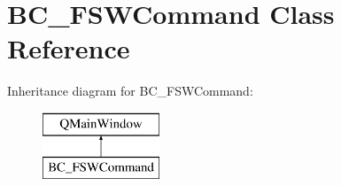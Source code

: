 \hypertarget{class_b_c___f_s_w_command}{}\section{B\+C\+\_\+\+F\+S\+W\+Command Class Reference}
\label{class_b_c___f_s_w_command}
Inheritance diagram for B\+C\+\_\+\+F\+S\+W\+Command\+:\begin{figure}[H]
\begin{center}
\leavevmode
\includegraphics[height=2.000000cm]{class_b_c___f_s_w_command}
\end{center}
\end{figure}
